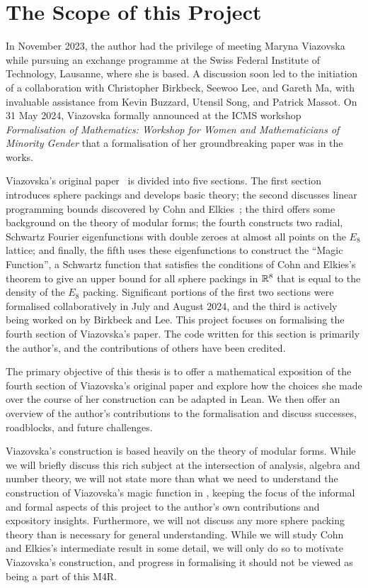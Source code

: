 \section{The Scope of this Project}


In November 2023, the author had the privilege of meeting Maryna Viazovska while pursuing an exchange programme at the Swiss Federal Institute of Technology, Lausanne, where she is based. A discussion soon led to the initiation of a collaboration with Christopher Birkbeck, Seewoo Lee, and Gareth Ma, with invaluable assistance from Kevin Buzzard, Utensil Song, and Patrick Massot. On 31 May 2024, Viazovska formally announced at the ICMS workshop \textit{Formalisation of Mathematics: Workshop for Women and Mathematicians of Minority Gender} that a formalisation of her groundbreaking paper was in the works.

Viazovska's original paper~\cite{Viazovska8} is divided into five sections. The first section introduces sphere packings and develops basic theory; the second discusses linear programming bounds discovered by Cohn and Elkies~\cite[Theorem 3.1]{CohnElkies}; the third offers some background on the theory of modular forms; the fourth constructs two radial, Schwartz Fourier eigenfunctions with double zeroes at almost all points on the $E_8$ lattice; and finally, the fifth uses these eigenfunctions to construct the ``Magic Function'', a Schwartz function that satisfies the conditions of Cohn and Elkies's theorem to give an upper bound for all sphere packings in $\mathbb{R}^8$ that is equal to the density of the $E_8$ packing. Significant portions of the first two sections were formalised collaboratively in July and August 2024, and the third is actively being worked on by Birkbeck and Lee. This project focuses on formalising the fourth section of Viazovska's paper. The code written for this section is primarily the author's, and the contributions of others have been credited.

The primary objective of this thesis is to offer a mathematical exposition of the fourth section of Viazovska's original paper and explore how the choices she made over the course of her construction can be adapted in Lean. We then offer an overview of the author's contributions to the formalisation and discuss successes, roadblocks, and future challenges.

Viazovska's construction is based heavily on the theory of modular forms. While we will briefly discuss this rich subject at the intersection of analysis, algebra and number theory, we will not state more than what we need to understand the construction of Viazovska's magic function in \cite[\S 4]{Viazovska8}, keeping the focus of the informal and formal aspects of this project to the author's own contributions and expository insights. Furthermore, we will not discuss any more sphere packing theory than is necessary for general understanding. While we will study Cohn and Elkies's intermediate result in some detail, we will only do so to motivate Viazovska's construction, and progress in formalising it should not be viewed as being a part of this M4R.

